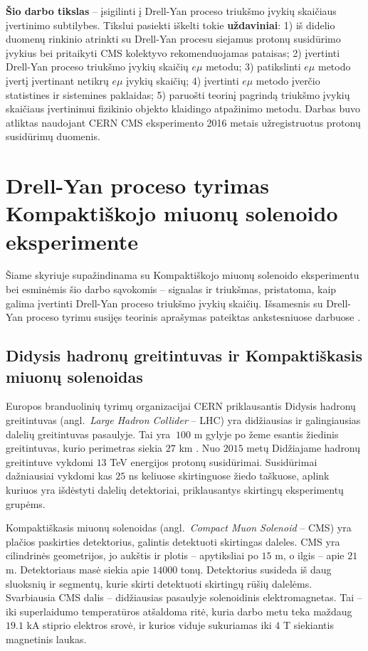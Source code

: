 \documentclass[a4paper, 12pt, oneside]{article}
\newcommand{\emu}{e\mu}
\begin{document}
\textbf{Šio darbo tikslas} -- įsigilinti į Drell-Yan proceso triukšmo įvykių skaičiaus įvertinimo subtilybes.
Tikslui pasiekti iškelti tokie \textbf{uždaviniai}:
1) iš didelio duomenų rinkinio atrinkti su Drell-Yan procesu siejamus protonų susidūrimo įvykius bei pritaikyti
CMS kolektyvo rekomenduojamas pataisas;
2) įvertinti Drell-Yan proceso triukšmo įvykių skaičių $\emu$ metodu;
3) patikslinti $\emu$ metodo įvertį įvertinant netikrų $\emu$ įvykių skaičių;
4) įvertinti $\emu$ metodo įverčio statistines ir sistemines paklaidas;
5) paruošti teorinį pagrindą triukšmo įvykių skaičiaus įvertinimui fizikinio objekto klaidingo atpažinimo metodu.
Darbas buvo atliktas naudojant CERN CMS eksperimento 2016 metais užregistruotus protonų susidūrimų duomenis.

\section{Drell-Yan proceso tyrimas Kompaktiškojo miuonų solenoido eksperimente}

Šiame skyriuje supažindinama su Kompaktiškojo miuonų solenoido eksperimentu bei esminėmis šio darbo sąvokomis --
signalas ir triukšmas, pristatoma, kaip galima įvertinti Drell-Yan proceso triukšmo įvykių skaičių.
Išsamesnis su Drell-Yan proceso tyrimu susijęs teorinis aprašymas pateiktas ankstesniuose darbuose \cite{MAbak, MAk1}.

\subsection{Didysis hadronų greitintuvas ir Kompaktiškasis miuonų solenoidas}

Europos branduolinių tyrimų organizacijai CERN priklausantis Didysis hadronų greitintuvas
(angl.\ \textit{Large Hadron Collider} -- LHC) yra didžiausias ir galingiausias dalelių greitintuvas pasaulyje.
Tai yra $~100$ m gylyje po žeme esantis žiedinis greitintuvas, kurio perimetras siekia $27$ km \cite{LHC}.
Nuo $2015$ metų Didžiajame hadronų greitintuve vykdomi $13$ TeV energijos protonų susidūrimai.
Susidūrimai dažniausiai vykdomi kas $25$ ns keliuose skirtinguose žiedo taškuose, aplink kuriuos yra išdėstyti dalelių
detektoriai, priklausantys skirtingų eksperimentų grupėms.

Kompaktiškasis miuonų solenoidas (angl.\ \textit{Compact Muon Solenoid} -- CMS) yra plačios paskirties
detektorius, galintis detektuoti skirtingas daleles.
CMS yra cilindrinės geometrijos, jo aukštis ir plotis -- apytiksliai po $15$ m, o ilgis --
apie $21$ m.
Detektoriaus masė siekia apie $14000$ tonų.
Detektorius susideda iš daug sluoksnių ir segmentų, kurie skirti detektuoti skirtingų rūšių dalelėms.
Svarbiausia CMS dalis -- didžiausias pasaulyje solenoidinis elektromagnetas.
Tai -- iki superlaidumo temperatūros atšaldoma ritė, kuria darbo metu teka maždaug $19.1$ kA stiprio
elektros srovė, ir kurios viduje sukuriamas iki $4$ T siekiantis magnetinis laukas.
\end{document}
